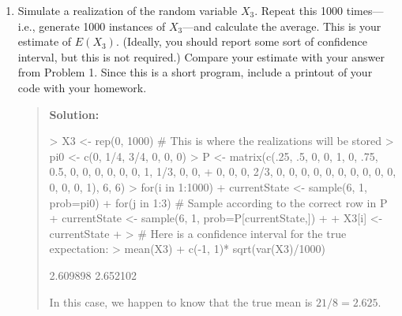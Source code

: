 \documentclass{article}
\begin{document}
\begin{enumerate}
  \begin{enumerate}

    \item Simulate a realization of the random variable $X_3$. Repeat this 1000
    times---i.e., generate 1000 instances of $X_3$---and calculate the average.
    This is your estimate of $E(X_3)$. (Ideally, you should report some sort of
    confidence interval, but this is not required.) Compare your estimate with
    your answer from Problem 1. Since this is a short program, include a
    printout of your code with your homework.
    \begin{quotation}{\bf Solution:}
\begin{Schunk}
\begin{Sinput}
> X3 <- rep(0, 1000) # This is where the realizations will be stored
> pi0 <- c(0, 1/4, 3/4, 0, 0, 0)
> P <- matrix(c(.25, .5, 0, 0, 1, 0, .75, 0.5, 0, 0, 0, 0, 0, 0, 1, 1/3, 0, 0,
+             0, 0, 0, 2/3, 0, 0, 0, 0, 0, 0, 0, 0, 0, 0, 0, 0, 0, 1), 6, 6)
> for(i in 1:1000) {
+   currentState <- sample(6, 1, prob=pi0)
+   for(j in 1:3) { # Sample according to the correct row in P
+     currentState <- sample(6, 1, prob=P[currentState,])
+   }
+   X3[i] <- currentState
+ }
> # Here is a confidence interval for the true expectation:
> mean(X3) + c(-1, 1)* sqrt(var(X3)/1000)
\end{Sinput}
\begin{Soutput}
[1] 2.609898 2.652102
\end{Soutput}
\end{Schunk}
In this case, we happen to know that the true mean is $21/8=2.625$.
    \end{quotation}
  

\end{enumerate}
\end{enumerate}
\end{document}
